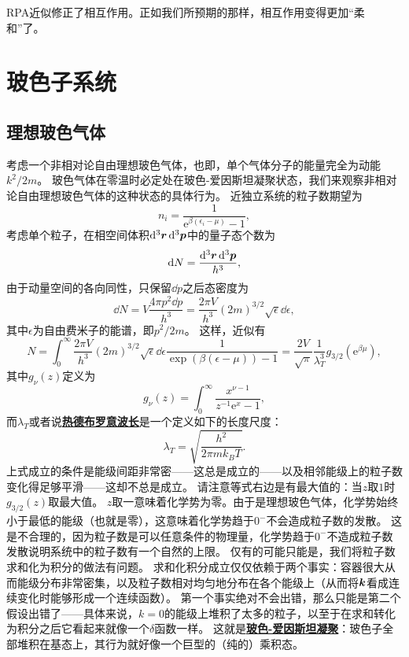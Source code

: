 \documentclass[hyperref, UTF8, a4paper]{ctexart}
\newcommand*{\ee}{\mathrm{e}}
\newcommand{\concept}[1]{\underline{\textbf{#1}}}
\begin{document}
RPA近似修正了相互作用。正如我们所预期的那样，相互作用变得更加“柔和”了。

\section{玻色子系统}

\subsection{理想玻色气体}

考虑一个非相对论自由理想玻色气体，也即，单个气体分子的能量完全为动能$k^2/2m$。
玻色气体在零温时必定处在玻色-爱因斯坦凝聚状态，我们来观察非相对论自由理想玻色气体的这种状态的具体行为。
近独立系统的粒子数期望为
\[
    n_i = \frac{1}{\ee^{\beta(\epsilon_i - \mu)} - 1},
\]
考虑单个粒子，在相空间体积$\dd[3]{\vb*{r}} \dd[3]{\vb*{p}}$中的量子态个数为
\[
    \dd{N} = \frac{\dd[3]{\vb*{r}} \dd[3]{\vb*{p}}}{h^3},
\]
由于动量空间的各向同性，只保留$\dd{p}$之后态密度为
\[
    \dd{N} = V \frac{4\pi p^2 \dd{p}}{h^3} = \frac{2\pi V}{h^3} (2m)^{3/2} \sqrt{\epsilon} \dd{\epsilon},
\]
其中$\epsilon$为自由费米子的能谱，即$p^2/2m$。
这样，近似有
\begin{equation}
    N = \int_0^\infty \frac{2\pi V}{h^3} (2m)^{3/2} \sqrt{\epsilon} \dd{\epsilon} \frac{1}{\exp(\beta (\epsilon - \mu)) - 1} = \frac{2V}{\sqrt{\pi}} \frac{1}{\lambda_T^3} g_{3/2}(\ee^{\beta \mu}),
\end{equation}
其中$g_\nu(z)$定义为
\[
    g_\nu(z) = \int_0^\infty \frac{x^{\nu-1}}{z^{-1} \ee^{x} - 1},
\]
而$\lambda_T$或者说\concept{热德布罗意波长}是一个定义如下的长度尺度：
\begin{equation}
    \lambda_T = \sqrt{\frac{h^2}{2\pi m k_B T}}.
\end{equation}
上式成立的条件是能级间距非常密——这总是成立的——以及相邻能级上的粒子数变化得足够平滑——这却不总是成立。
请注意等式右边是有最大值的：当$z$取$1$时$g_{3/2}(z)$取最大值。
$z$取一意味着化学势为零。由于是理想玻色气体，化学势始终小于最低的能级（也就是零），这意味着化学势趋于$0^-$不会造成粒子数的发散。
这是不合理的，因为粒子数是可以任意条件的物理量，化学势趋于$0^-$不造成粒子数发散说明系统中的粒子数有一个自然的上限。
仅有的可能只能是，我们将粒子数求和化为积分的做法有问题。
求和化积分成立仅仅依赖于两个事实：容器很大从而能级分布非常密集，以及粒子数相对均匀地分布在各个能级上（从而将$\vb*{k}$看成连续变化时能够形成一个连续函数）。
第一个事实绝对不会出错，那么只能是第二个假设出错了——具体来说，$k=0$的能级上堆积了太多的粒子，以至于在求和转化为积分之后它看起来就像一个$\delta$函数一样。
这就是\concept{玻色-爱因斯坦凝聚}：玻色子全部堆积在基态上，其行为就好像一个巨型的（纯的）乘积态。
\end{document}
